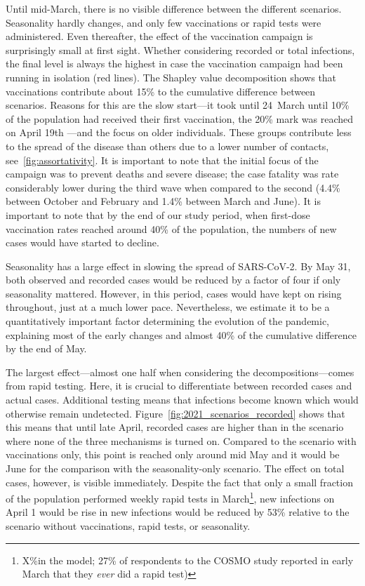 Until mid-March, there is no visible difference between the different scenarios.
Seasonality hardly changes, and only few vaccinations or rapid tests were administered.
Even thereafter, the effect of the vaccination campaign is surprisingly small at first
sight. Whether considering recorded or total infections, the final level is always the
highest in case the vaccination campaign had been running in isolation (red lines). The
Shapley value decomposition shows that vaccinations contribute about
15\% to the cumulative difference between scenarios. Reasons for
this are the slow start---it took until 24~March until 10\% of the population had
received their first vaccination, the 20\% mark was reached on April 19th ---and the
focus on older individuals. These groups contribute less to the spread of the disease
than others due to a lower number of contacts, see~\ref{fig:assortativity}. It is
important to note that the initial focus of the campaign was to prevent deaths and
severe disease; the case fatality was rate considerably lower during the third wave when
compared to the second (4.4\% between October and February and 1.4\% between March and
June). It is important to note that by the end of our study period, when first-dose
vaccination rates reached around 40\% of the population, the numbers of new cases would
have started to decline.

Seasonality has a large effect in slowing the spread of SARS-CoV-2. By May 31, both
observed and recorded cases would be reduced by a factor of four if only seasonality
mattered. However, in this period, cases would have kept on rising throughout, just at a
much lower pace. Nevertheless, we estimate it to be a quantitatively important factor
determining the evolution of the pandemic, explaining most of the early changes and
almost 40\% of the cumulative difference by the end of May.

The largest effect---almost one half when considering the decompositions---comes from
rapid testing. Here, it is crucial to differentiate between recorded cases and actual
cases. Additional testing means that infections become known which would otherwise
remain undetected. Figure~\ref{fig:2021_scenarios_recorded} shows that this means that
until late April, recorded cases are higher than in the scenario where none of the three
mechanisms is turned on. Compared to the scenario with vaccinations only, this point is
reached only around mid May and it would be June for the comparison with the
seasonality-only scenario. The effect on total cases, however, is visible immediately.
Despite the fact that only a small fraction of the population performed weekly rapid
tests in March\footnote{X\%in the model; 27\% of respondents to
the COSMO study reported in early March that they \textit{ever} did a rapid test)}, new
infections on April 1 would be rise in new infections would be reduced by 53\% relative
to the scenario without vaccinations, rapid tests, or seasonality.


